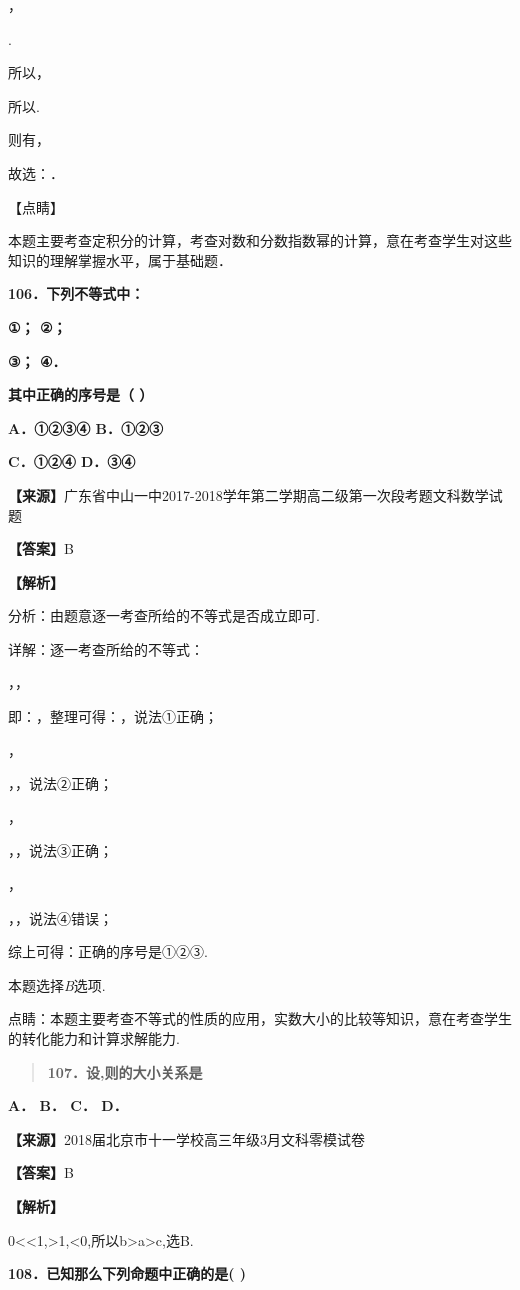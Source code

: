 \documentclass[
]{article}
\begin{document}
，

.

所以，

所以.

则有，

故选：．

【点睛】

本题主要考查定积分的计算，考查对数和分数指数幂的计算，意在考查学生对这些知识的理解掌握水平，属于基础题．

\textbf{106．下列不等式中：}

\textbf{①； ②；}

\textbf{③； ④．}

\textbf{其中正确的序号是（ ）}

\textbf{A．①②③④ B．①②③}

\textbf{C．①②④ D．③④}

\textbf{【来源】}广东省中山一中2017-2018学年第二学期高二级第一次段考题文科数学试题

\textbf{【答案】}B

\textbf{【解析】}

分析：由题意逐一考查所给的不等式是否成立即可.

详解：逐一考查所给的不等式：

，，

即：，整理可得：，说法①正确；

，

，，说法②正确；

，

，，说法③正确；

，

，，说法④错误；

综上可得：正确的序号是①②③.

本题选择\emph{B}选项.

点睛：本题主要考查不等式的性质的应用，实数大小的比较等知识，意在考查学生的转化能力和计算求解能力.

\begin{quote}
\textbf{107．设,则的大小关系是}
\end{quote}

\textbf{A． B． C． D．}

\textbf{【来源】}2018届北京市十一学校高三年级3月文科零模试卷

\textbf{【答案】}B

\textbf{【解析】}

0\textless\textless1,\textgreater1,\textless0,所以b\textgreater a\textgreater c,选B.

\textbf{108．已知那么下列命题中正确的是( )}
\end{document}
